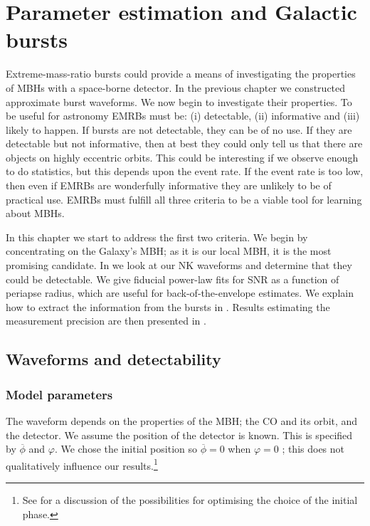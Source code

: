 \chapter{Parameter estimation and Galactic bursts\label{ch:param}}

Extreme-mass-ratio bursts could provide a means of investigating the properties of MBHs with a space-borne detector. In the previous chapter we constructed approximate burst waveforms. We now begin to investigate their properties. To be useful for astronomy EMRBs must be: (i) detectable, (ii) informative and (iii) likely to happen. If bursts are not detectable, they can be of no use. If they are detectable but not informative, then at best they could only tell us that there are objects on highly eccentric orbits. This could be interesting if we observe enough to do statistics, but this depends upon the event rate. If the event rate is too low, then even if EMRBs are wonderfully informative they are unlikely to be of practical use. EMRBs must fulfill all three criteria to be a viable tool for learning about MBHs.

In this chapter we start to address the first two criteria. We begin by concentrating on the Galaxy's MBH; as it is our local MBH, it is the most promising candidate. In  we look at our NK waveforms and determine that they could be detectable. We give fiducial power-law fits for SNR as a function of periapse radius, which are useful for back-of-the-envelope estimates. We explain how to extract the information from the bursts in . Results estimating the measurement precision are then presented in .


\section{Waveforms and detectability}\label{sec:Waveforms}

\subsection{Model parameters}\label{sec:Mod-param}

The waveform depends on the properties of the MBH; the CO and its orbit, and the detector. We assume the position of the detector is known. This is specified by $\overline{\phi}$ and $\varphi$. We chose the initial position so $\overline{\phi} = 0$ when $\varphi = 0$ \citep{Cutler1998}; this does not qualitatively influence our results.\footnote{See \citet{Jani2013} for a discussion of the possibilities for optimising the choice of the initial phase.}

